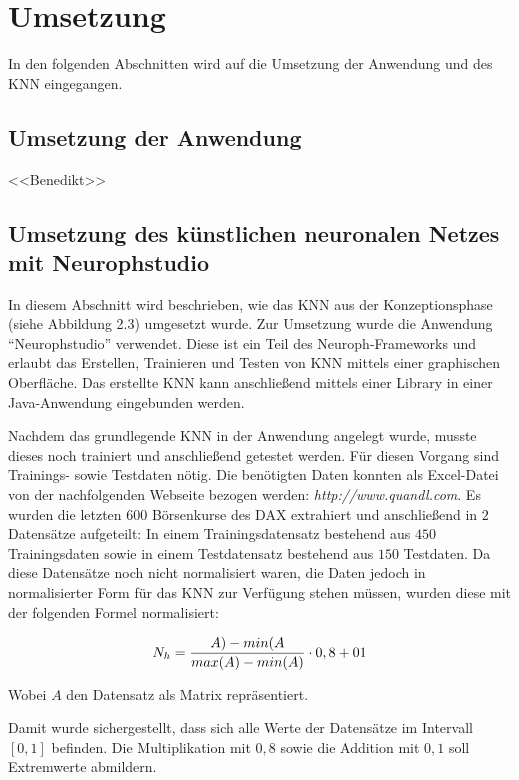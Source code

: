 \chapter{Umsetzung}
\label{chapter:Umsetzung}

In den folgenden Abschnitten wird auf die Umsetzung der Anwendung und des KNN eingegangen.

\section{Umsetzung der Anwendung}
\label{section:Umsetzung der Anwendung}
<<Benedikt>>\Blindtext

\section{Umsetzung des künstlichen neuronalen Netzes mit Neurophstudio} 
\label{section:Umsetzung des künstlichen neuronalen Netzes mit Neurophstudio}

In diesem Abschnitt wird beschrieben, wie das KNN aus der Konzeptionsphase (siehe Abbildung 2.3) umgesetzt wurde. Zur Umsetzung wurde die Anwendung "`Neurophstudio"' verwendet. Diese ist ein Teil des Neuroph-Frameworks und erlaubt das Erstellen, Trainieren und Testen von KNN mittels einer graphischen Oberfläche. Das erstellte KNN kann anschließend mittels einer Library in einer Java-Anwendung eingebunden werden.

Nachdem das grundlegende KNN in der Anwendung angelegt wurde, musste dieses noch trainiert und anschließend getestet werden. Für diesen Vorgang sind Trainings- sowie Testdaten nötig. Die benötigten Daten konnten als Excel-Datei von der nachfolgenden Webseite bezogen werden: \textit{http://www.quandl.com}. Es wurden die letzten $600$ Börsenkurse des DAX extrahiert und anschließend in $2$ Datensätze aufgeteilt: In einem Trainingsdatensatz bestehend aus $450$ Trainingsdaten sowie in einem Testdatensatz bestehend aus $150$ Testdaten. Da diese Datensätze noch nicht normalisiert waren, die Daten jedoch in normalisierter Form für das KNN zur Verfügung stehen müssen, wurden diese mit der folgenden Formel normalisiert:

\begin{equation}\formelentry{Normalisierungsformel}
  N_h = \frac{A)-min(A}{max(A)-min(A)}\cdot0,8+01
\end{equation}

Wobei $A$ den Datensatz als Matrix repräsentiert.

Damit wurde sichergestellt, dass sich alle Werte der Datensätze im Intervall $[0,1]$ befinden. Die Multiplikation mit $0,8$ sowie die Addition mit $0,1$ soll Extremwerte abmildern.

